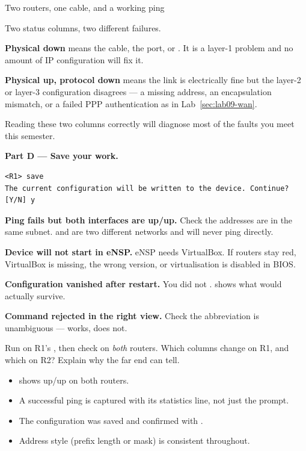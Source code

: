 \begin{labproject}{Two routers, one cable, and a working ping}
\begin{keyidea}
Two status columns, two different failures.

\textbf{Physical down} means the cable, the port, or . It is a layer-1 problem and no amount of IP configuration will fix it.

\textbf{Physical up, protocol down} means the link is electrically fine but the layer-2 or layer-3 configuration disagrees --- a missing address, an encapsulation mismatch, or a failed PPP authentication as in Lab~\ref{sec:lab09-wan}.

Reading these two columns correctly will diagnose most of the faults you meet this semester.
\end{keyidea}

\medskip\noindent\textbf{Part D --- Save your work.}\par
\begin{lstlisting}[style=dcnterminal]
<R1> save
The current configuration will be written to the device. Continue? [Y/N] y
\end{lstlisting}

\begin{troubleshoot}
\textbf{Ping fails but both interfaces are up/up.} Check the addresses are in the same subnet.  and  are two different networks and will never ping directly.

\textbf{Device will not start in eNSP.} eNSP needs VirtualBox. If routers stay red, VirtualBox is missing, the wrong version, or virtualisation is disabled in BIOS.

\textbf{Configuration vanished after restart.} You did not .  shows what would actually survive.

\textbf{Command rejected in the right view.} Check the abbreviation is unambiguous ---  works,  does not.
\end{troubleshoot}

\begin{tryit}
Run  on R1's , then check  on \emph{both} routers. Which columns change on R1, and which on R2? Explain why the far end can tell.
\end{tryit}
\end{labproject}

\begin{verifybox}
\begin{itemize}
  \item {} shows up/up on both routers.
  \item A successful ping is captured with its statistics line, not just the prompt.
  \item The configuration was saved and confirmed with .
  \item Address style (prefix length or mask) is consistent throughout.
\end{itemize}
\end{verifybox}


